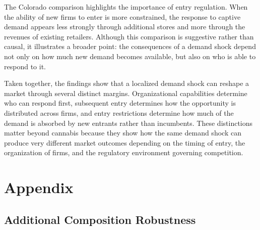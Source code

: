 \documentclass[english,12pt]{article}
\begin{document}
The Colorado comparison highlights the importance of entry regulation. When the ability of new firms to enter is more constrained, the response to captive demand appears less strongly through additional stores and more through the revenues of existing retailers. Although this comparison is suggestive rather than causal, it illustrates a broader point: the consequences of a demand shock depend not only on how much new demand becomes available, but also on who is able to respond to it.

Taken together, the findings show that a localized demand shock can reshape a market through several distinct margins. Organizational capabilities determine who can respond first, subsequent entry determines how the opportunity is distributed across firms, and entry restrictions determine how much of the demand is absorbed by new entrants rather than incumbents. These distinctions matter beyond cannabis because they show how the same demand shock can produce very different market outcomes depending on the timing of entry, the organization of firms, and the regulatory environment governing competition.


\newpage

\appendix
\section{Appendix}
\renewcommand{\thetable}{A.\arabic{table}}
\renewcommand{\thefigure}{A.\arabic{figure}}
\renewcommand{\theequation}{A.\arabic{equation}}
\setcounter{table}{0}
\setcounter{figure}{0}
\setcounter{equation}{0}

\subsection{Additional Composition Robustness}
\label{app:composition}

\begin{table}[htbp]
\centering\footnotesize

\caption{Composition result with Albuquerque included versus excluded from the pooled-control (legal-border $+$ interior) sample, full zero-inclusive 368-ZIP-code panel, inverse hyperbolic sine transformation. Albuquerque is interior by construction, so it does not affect the main (nonlegal- vs.\ always-legal-border) comparison.}
\label{tab:fact3abq}
\end{table}

\begin{table}[htbp]
\centering\footnotesize

\caption{Main specification re-estimated at the town level: full zero-inclusive panel of 78 town-markets (Albuquerque excluded), inverse hyperbolic sine transformation, same controls as the ZIP-code main specification (no market-age control).}
\label{tab:townlevel}
\end{table}
\end{document}
